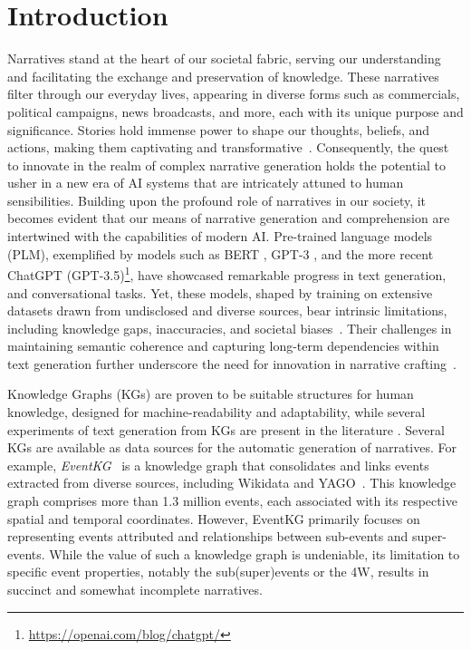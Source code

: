 \documentclass[
hf, %
]{ceurart}
\begin{document}
\section{Introduction}
\label{sec:introduction}
Narratives stand at the heart of our societal fabric, serving our understanding and facilitating the exchange and preservation of knowledge. These narratives filter through our everyday lives, appearing in diverse forms such as commercials, political campaigns, news broadcasts, and more, each with its unique purpose and significance.
Stories hold immense power to shape our thoughts, beliefs, and actions, making them captivating and transformative~\cite{green2004understanding}. Consequently, the quest to innovate in the realm of complex narrative generation holds the potential to usher in a new era of AI systems that are intricately attuned to human sensibilities. Building upon the profound role of narratives in our society, it becomes evident that our means of narrative generation and comprehension are intertwined with the capabilities of modern AI. Pre-trained language models (PLM), exemplified by models such as BERT \cite{BERT}, GPT-3 \cite{GPT-3}, and the more recent ChatGPT (GPT-3.5)\footnote{\url{https://openai.com/blog/chatgpt/}}, have showcased remarkable progress in text generation, and conversational tasks. Yet, these models, shaped by training on extensive datasets drawn from undisclosed and diverse sources, bear intrinsic limitations, including knowledge gaps, inaccuracies, and societal biases~\cite{GPT-3,documenting_corpora}. Their challenges in maintaining semantic coherence and capturing long-term dependencies within text generation further underscore the need for innovation in narrative crafting~\cite{PLM_survey,semantic_coherence}.

Knowledge Graphs (KGs) are proven to be suitable structures for human knowledge, designed for machine-readability and adaptability, while several experiments of text generation from KGs are present in the literature \cite{KG_survey}. Several KGs are available as data sources for the automatic generation of narratives. For example, \textit{EventKG}~\cite{gottschalk2019eventkg} is a knowledge graph that consolidates and links events extracted from diverse sources, including Wikidata and YAGO~\cite{hoffart2013yago2}. This knowledge graph comprises more than 1.3 million events, each associated with its respective spatial and temporal coordinates. However, EventKG primarily focuses on representing events attributed and relationships between sub-events and super-events. While the value of such a knowledge graph is undeniable, its limitation to specific event properties, notably the sub(super)events or the 4W, results in succinct and somewhat incomplete narratives.
\end{document}
